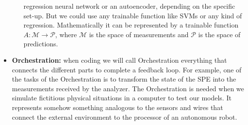 \documentclass[11pt,a4paper,twoside]{report}
\newcommand{\+}{\textnormal{+} }
\theoremstyle{definition}
\numberwithin{equation}{chapter}
\begin{document}
\begin{itemize}
\begin{itemize}
        regression neural network or an autoencoder, depending on the specific
        set-up. But we could use any trainable function like SVMs or any kind of
        regression. Mathematically it can be represented by a trainable function
        $ A :\mathcal{M} \rightarrow \mathcal{P}$, where $\mathcal{M}$ is the
        space of measurements and $\mathcal{P}$ is the space of predictions.
  \end{itemize}
    \item \textbf{Orchestration:} when coding we will call Orchestration
    everything that connects the different parts to complete a feedback loop.
    For example, one of the tasks of the Orchestration is to transform the state
    of the SPE into the measurements received by the analyzer. The Orchestration
    is needed when we simulate fictitious physical situations in a computer to
    test our models. It represents somehow something analogous to the sensors
    and wires that connect the external environment to the processor of an
    autonomous robot.
\end{itemize}
\end{document}
